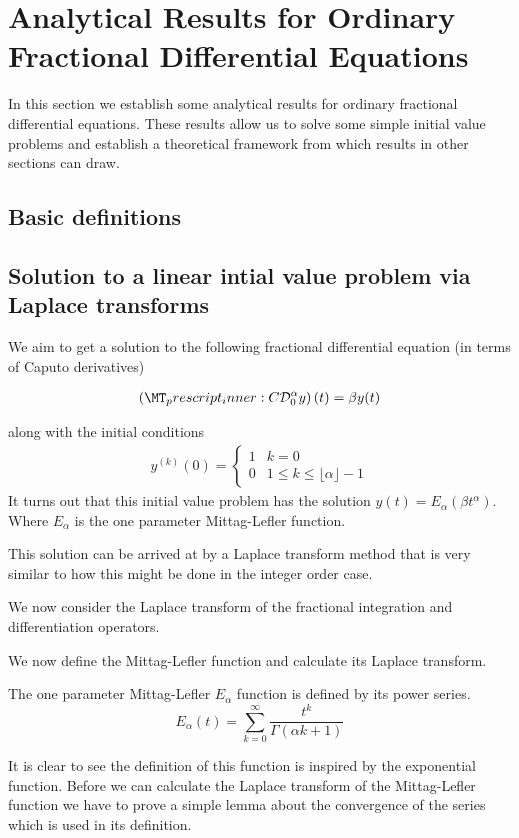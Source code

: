 \section{Analytical Results for Ordinary Fractional Differential Equations}
In this section we establish some analytical results for ordinary fractional differential equations. These results allow us to solve some simple initial value problems and establish a theoretical framework from which results in other sections can draw.

\subsection{Basic definitions}

\subsection{Solution to a linear intial value problem via Laplace transforms}
We aim to get a solution to the following fractional differential equation (in terms of Caputo derivatives)

\begin{align}
	\label{eq:fde-1}
	\left( \prescript{C}{}{\mathcal{D}_0^\alpha}y \right)(t) = \beta y(t) 
\end{align}

along with the initial conditions 
\begin{align}
	\label{eq:fde-1-ic}
	y^{(k)}(0) = 
	\begin{cases}
		1 & k = 0 \\
		0 & 1 \leq k \leq \lfloor\alpha \rfloor - 1  
	\end{cases}
\end{align}
It turns out that this initial value problem has the solution $ y(t) = E_\alpha \left( \beta t^\alpha \right) $. Where $ E_\alpha $ is the one parameter Mittag-Lefler function.

This solution can be arrived at by a Laplace transform method that is very similar to how this might be done in the integer order case.

We now consider the Laplace transform of the fractional integration and differentiation operators.

	We now define the Mittag-Lefler function and calculate its Laplace transform.

\begin{definition}
	The one parameter Mittag-Lefler $ E_\alpha $ function is defined by its power series.
	$$
		E_\alpha(t) = \sum_{k=0}^{\infty} \frac{t^k}{\Gamma(\alpha k + 1)}
	$$
\end{definition}
It is clear to see the definition of this function is inspired by the exponential function. Before we can calculate the 
Laplace transform of the Mittag-Lefler function we have to prove a simple lemma about the convergence of the 
series which is used in its definition.

